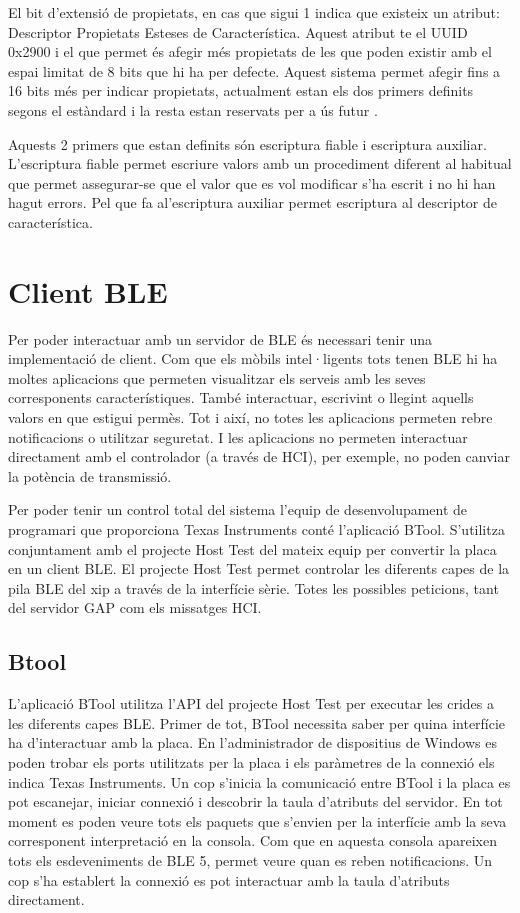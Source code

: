 El bit d'extensió de propietats, en cas que sigui 1 indica que existeix un atribut: Descriptor Propietats Esteses de Característica.
Aquest atribut te el UUID 0x2900 i el que permet és afegir més propietats de les que poden existir amb el espai limitat de 8 bits que hi ha per defecte.
Aquest sistema permet afegir fins a 16 bits més per indicar propietats, actualment estan els dos primers definits segons el estàndard i la resta estan reservats per a ús futur \cite{extended properties}.

Aquests 2 primers que estan definits són escriptura fiable i escriptura auxiliar.
L'escriptura fiable permet escriure valors amb un procediment diferent al habitual que permet assegurar-se que el valor que es vol modificar s'ha escrit i no hi han hagut errors.
Pel que fa  al'escriptura auxiliar permet escriptura al descriptor de característica. %



\section{Client BLE}
Per poder interactuar amb un servidor de BLE és necessari tenir una implementació de client.
Com que els mòbils intel·ligents tots tenen BLE hi ha moltes aplicacions que permeten visualitzar els serveis amb les seves corresponents característiques.
També interactuar, escrivint o llegint aquells valors en que estigui permès.
Tot i així, no totes les aplicacions permeten rebre notificacions o utilitzar seguretat.
I les aplicacions no permeten interactuar directament amb el controlador (a través de HCI), per exemple, no poden canviar la potència de transmissió. 

Per poder tenir un control total del sistema l'equip de desenvolupament de programari que proporciona Texas Instruments conté l'aplicació BTool.
S'utilitza conjuntament amb el projecte Host Test del mateix equip per convertir la placa en un client BLE.
El projecte Host Test permet controlar les diferents capes de la pila BLE del xip a través de la interfície sèrie.
Totes les possibles peticions, tant del servidor GAP com els missatges HCI.

\subsection{Btool}
L'aplicació BTool utilitza l'API del projecte Host Test per executar les crides a les diferents capes BLE.
Primer de tot, BTool necessita saber per quina interfície ha d'interactuar amb la placa.
En l'administrador de dispositius de Windows es poden trobar els ports utilitzats per la placa i els paràmetres de la connexió els indica Texas Instruments\cite{serial_params}.
Un cop s'inicia la comunicació entre BTool i la placa es pot escanejar, iniciar connexió i descobrir la taula d'atributs del servidor.
En tot moment es poden veure tots els paquets que s'envien per la interfície amb la seva corresponent interpretació en la consola.
Com que en aquesta consola apareixen tots els esdeveniments de BLE 5, permet veure quan es reben notificacions.
Un cop s'ha establert la connexió es pot interactuar amb la taula d'atributs directament.


